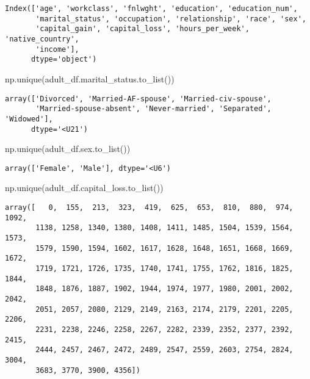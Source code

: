 \documentclass[
  letterpaper,
  DIV=11,
  numbers=noendperiod]{scrartcl}
\newenvironment{Shaded}{\begin{snugshade}}{\end{snugshade}}
\newcommand{\NormalTok}[1]{\textcolor[rgb]{0.00,0.23,0.31}{#1}}
\begin{document}
\begin{verbatim}
Index(['age', 'workclass', 'fnlwght', 'education', 'education_num',
       'marital_status', 'occupation', 'relationship', 'race', 'sex',
       'capital_gain', 'capital_loss', 'hours_per_week', 'native_country',
       'income'],
      dtype='object')
\end{verbatim}

\begin{Shaded}
\begin{Highlighting}[]
\NormalTok{np.unique(adult\_df.marital\_status.to\_list())}
\end{Highlighting}
\end{Shaded}

\begin{verbatim}
array(['Divorced', 'Married-AF-spouse', 'Married-civ-spouse',
       'Married-spouse-absent', 'Never-married', 'Separated', 'Widowed'],
      dtype='<U21')
\end{verbatim}

\begin{Shaded}
\begin{Highlighting}[]
\NormalTok{np.unique(adult\_df.sex.to\_list())}
\end{Highlighting}
\end{Shaded}

\begin{verbatim}
array(['Female', 'Male'], dtype='<U6')
\end{verbatim}

\begin{Shaded}
\begin{Highlighting}[]
\NormalTok{np.unique(adult\_df.capital\_loss.to\_list())}
\end{Highlighting}
\end{Shaded}

\begin{verbatim}
array([   0,  155,  213,  323,  419,  625,  653,  810,  880,  974, 1092,
       1138, 1258, 1340, 1380, 1408, 1411, 1485, 1504, 1539, 1564, 1573,
       1579, 1590, 1594, 1602, 1617, 1628, 1648, 1651, 1668, 1669, 1672,
       1719, 1721, 1726, 1735, 1740, 1741, 1755, 1762, 1816, 1825, 1844,
       1848, 1876, 1887, 1902, 1944, 1974, 1977, 1980, 2001, 2002, 2042,
       2051, 2057, 2080, 2129, 2149, 2163, 2174, 2179, 2201, 2205, 2206,
       2231, 2238, 2246, 2258, 2267, 2282, 2339, 2352, 2377, 2392, 2415,
       2444, 2457, 2467, 2472, 2489, 2547, 2559, 2603, 2754, 2824, 3004,
       3683, 3770, 3900, 4356])
\end{verbatim}
\end{document}
